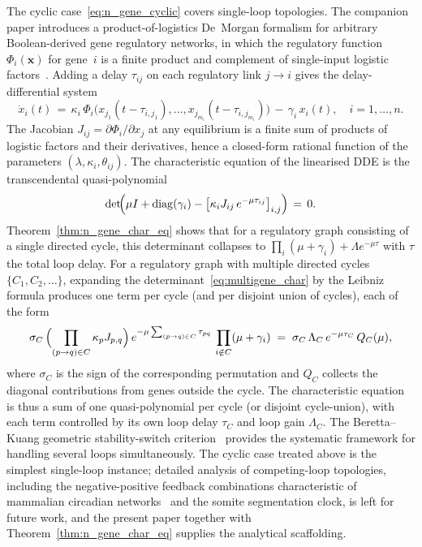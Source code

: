 \documentclass[sn-mathphys,Numbered]{sn-jnl}
\theoremstyle{thmstyleone}
\theoremstyle{thmstyletwo}
\theoremstyle{thmstylethree}
\begin{document}
The cyclic case~\eqref{eq:n_gene_cyclic} covers single-loop topologies.
The companion paper introduces a product-of-logistics De~Morgan
formalism for arbitrary Boolean-derived gene regulatory networks, in
which the regulatory function $\Phi_i(\mathbf{x})$ for gene~$i$ is a
finite product and complement of single-input logistic
factors~\cite{belgacem2026logistic}. Adding a delay $\tau_{ij}$ on each
regulatory link $j\to i$ gives the delay-differential system
\[
\dot{x}_i(t) \,=\, \kappa_i\,
   \Phi_i\bigl(x_{j_1}(t-\tau_{i,j_1}),\ldots,
                x_{j_{m_i}}(t-\tau_{i,j_{m_i}})\bigr)
   \,-\, \gamma_i\,x_i(t),
\quad i=1,\ldots,n.
\]
The Jacobian $J_{ij} = \partial\Phi_i/\partial x_j$ at any equilibrium
is a finite sum of products of logistic factors and their derivatives,
hence a closed-form rational function of the parameters
$(\lambda,\kappa_i,\theta_{ij})$. The characteristic equation of the
linearised DDE is the transcendental quasi-polynomial
\begin{equation}
\det\!\Bigl(\mu I + \mathrm{diag}(\gamma_i)
      - \bigl[\kappa_i J_{ij}\,e^{-\mu\tau_{ij}}\bigr]_{i,j}\Bigr)
\,=\, 0.
\label{eq:multigene_char}
\end{equation}
Theorem~\ref{thm:n_gene_char_eq} shows that for a regulatory graph
consisting of a single directed cycle, this determinant collapses to
$\prod_i(\mu+\gamma_i)+\Lambda e^{-\mu\tau}$ with $\tau$ the total
loop delay. For a regulatory graph with multiple directed cycles
$\{C_1,C_2,\ldots\}$, expanding the
determinant~\eqref{eq:multigene_char} by the Leibniz formula produces
one term per cycle (and per disjoint union of cycles), each of the form
\[
\sigma_C\,\Bigl(\prod_{(p\to q)\in C}\kappa_p J_{p,q}\Bigr)\,
e^{-\mu\sum_{(p\to q)\in C}\tau_{pq}}\,
\prod_{i\notin C}(\mu+\gamma_i)
\;=\; \sigma_C\,\Lambda_C\,e^{-\mu\tau_C}\,Q_C(\mu),
\]
where $\sigma_C$ is the sign of the corresponding permutation and
$Q_C$ collects the diagonal contributions from genes outside the
cycle. The characteristic equation is thus a sum of one
quasi-polynomial per cycle (or disjoint cycle-union), with each term
controlled by its own loop delay $\tau_C$ and loop gain $\Lambda_C$.
The Beretta--Kuang geometric stability-switch
criterion~\cite{beretta2002geometric} provides the systematic
framework for handling several loops simultaneously. The cyclic case
treated above is the simplest single-loop instance; detailed analysis
of competing-loop topologies, including the negative-positive
feedback combinations characteristic of mammalian circadian
networks~\cite{smolen2002reduced} and the somite segmentation clock,
is left for future work, and the present paper together with
Theorem~\ref{thm:n_gene_char_eq} supplies the analytical scaffolding.
\end{document}
